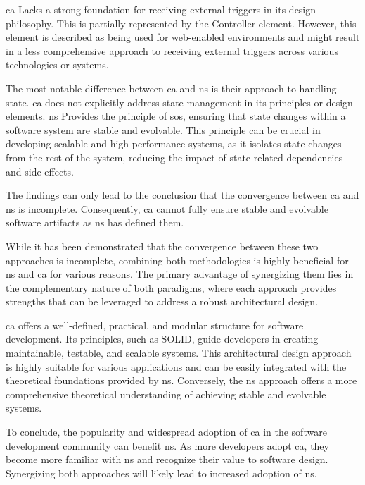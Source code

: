 \gls{ca} Lacks a strong foundation for receiving external triggers in its design
philosophy. This is partially represented by the Controller element. However, this element
is described as being used for web-enabled environments and might result in a less
comprehensive approach to receiving external triggers across various technologies or
systems.

The most notable difference between \gls{ca} and \gls{ns} is their approach to handling
state. \gls{ca} does not explicitly address state management in its principles or design
elements. \gls{ns} Provides the principle of \gls{sos}, ensuring that state changes within
a software system are stable and evolvable. This principle can be crucial in developing
scalable and high-performance systems, as it isolates state changes from the rest of the
system, reducing the impact of state-related dependencies and side effects. 

The findings can only lead to the conclusion that the convergence between \gls{ca} and
\gls{ns} is incomplete.  Consequently, \gls{ca} cannot fully ensure stable and evolvable
software artifacts as \gls{ns} has defined them.

While it has been demonstrated that the convergence between these two approaches is
incomplete, combining both methodologies is highly beneficial for \gls{ns} and \gls{ca}
for various reasons. The primary advantage of synergizing them lies in the complementary
nature of both paradigms, where each approach provides strengths that can be leveraged to
address a robust architectural design. 

\gls{ca} offers a well-defined, practical, and modular structure for software development.
Its principles, such as SOLID, guide developers in creating maintainable, testable, and
scalable systems. This architectural design approach is highly suitable for various
applications and can be easily integrated with the theoretical foundations provided by
\gls{ns}. Conversely, the \gls{ns} approach offers a more comprehensive theoretical
understanding of achieving stable and evolvable systems. 

To conclude, the popularity and widespread adoption of \gls{ca} in the software
development community can benefit \gls{ns}. As more developers adopt \gls{ca}, they become
more familiar with \gls{ns} and recognize their value to software design. Synergizing both
approaches will likely lead to increased adoption of \gls{ns}.